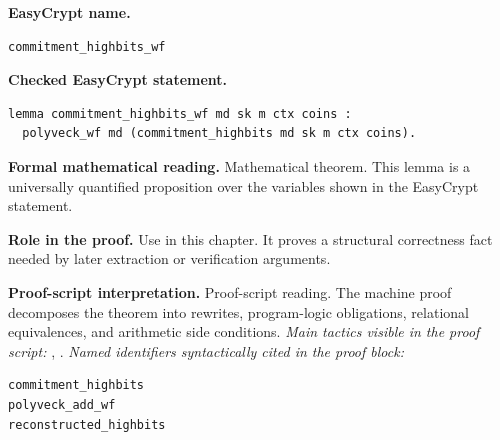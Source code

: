\begin{formaltheorem}
\noindent\textbf{EasyCrypt name.}
\begin{lstlisting}[language=EasyCrypt,basicstyle=\ttfamily\scriptsize]
commitment_highbits_wf
\end{lstlisting}
\noindent\textbf{Checked EasyCrypt statement.}
\begin{lstlisting}[language=EasyCrypt,basicstyle=\ttfamily\scriptsize]
lemma commitment_highbits_wf md sk m ctx coins :
  polyveck_wf md (commitment_highbits md sk m ctx coins).
\end{lstlisting}
\noindent\textbf{Formal mathematical reading.}
Mathematical theorem. This lemma is a universally quantified proposition over the variables shown in the EasyCrypt statement.

\noindent\textbf{Role in the proof.}
Use in this chapter. It proves a structural correctness fact needed by later extraction or verification arguments.

\noindent\textbf{Proof-script interpretation.}
Proof-script reading. The machine proof decomposes the theorem into rewrites, program-logic obligations, relational equivalences, and arithmetic side conditions.
\emph{Main tactics visible in the proof script:} , .
\emph{Named identifiers syntactically cited in the proof block:}
\begin{lstlisting}[language=EasyCrypt,basicstyle=\ttfamily\scriptsize]
commitment_highbits
polyveck_add_wf
reconstructed_highbits
\end{lstlisting}

\end{formaltheorem}


